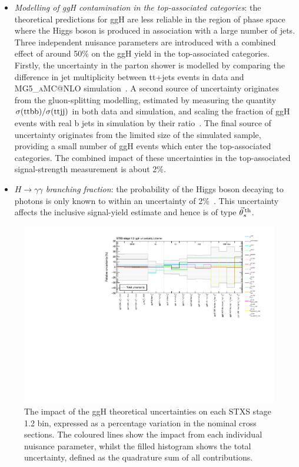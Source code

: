 \begin{itemize}
    \item \textit{Modelling of ggH contamination in the top-associated categories}: the theoretical predictions for ggH are less reliable in the region of phase space where the Higgs boson is produced in association with a large number of jets. Three independent nuisance parameters are introduced with a combined effect of around 50\% on the ggH yield in the top-associated categories. Firstly, the uncertainty in the parton shower is modelled by comparing the difference in jet multiplicity between tt+jets events in data and \textsc{MG5\_aMC@NLO} simulation~\cite{Sirunyan:2018ucr}. A second source of uncertainty originates from the gluon-splitting modelling, estimated by measuring the quantity $\sigma({\rm{ttbb}})/\sigma({\rm{ttjj}})$ in both data and simulation, and scaling the fraction of ggH events with real b jets in simulation by their ratio~\cite{CMS-PAS-TOP-16-010}. The final source of uncertainty originates from the limited size of the simulated sample, providing a small number of ggH events which enter the top-associated categories. The combined impact of these uncertainties in the top-associated signal-strength measurement is about 2\%.
    
    \item \textit{$H\rightarrow\gamma\gamma$ branching fraction}: the probability of the Higgs boson decaying to photons is only known to within an uncertainty of 2\%~\cite{deFlorian:2016spz}. This uncertainty affects the inclusive signal-yield estimate and hence is of type $\vec{\theta}^{\,\rm{th}}_{s}$.
\end{itemize}

\begin{figure}
  \centering
  \includegraphics[width=1\textwidth]{Figures/hgg_stats/ggH_NPScheme.pdf}
  \caption[STXS stage 1.2 ggH uncertainty scheme]
  {
    The impact of the ggH theoretical uncertainties on each STXS stage 1.2 bin, expressed as a percentage variation in the nominal cross sections. The coloured lines show the impact from each individual nuisance parameter, whilst the filled histogram shows the total uncertainty, defined as the quadrature sum of all contributions.
  }
  \label{fig:ggH_uncertainty_scheme}
\end{figure}

